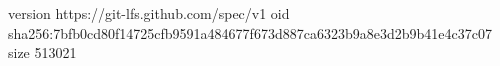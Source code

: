 version https://git-lfs.github.com/spec/v1
oid sha256:7bfb0cd80f14725cfb9591a484677f673d887ca6323b9a8e3d2b9b41e4c37c07
size 513021
